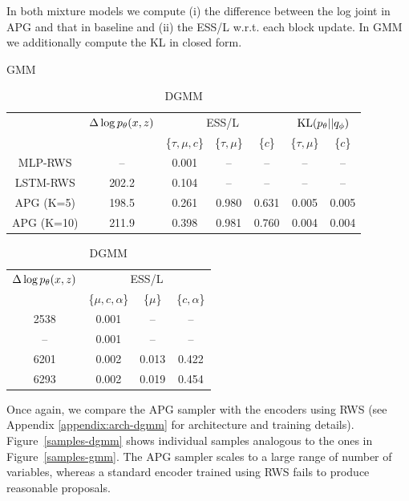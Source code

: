 \documentclass[anonymous=false, %
               format=acmsmall, %
               review=true, %
               screen=true, %
               nonacm=true]{acmart}
\theoremstyle{definition}
\begin{document}
\setlength{\tabcolsep}{2pt}
\begin{table}[t!]
    \centering
    \caption{In both mixture models we compute (i) the difference between the log joint in APG and that in baseline and (ii) the ESS/L w.r.t. each block update. In GMM we additionally compute the KL in closed form.}
    \vspace*{-3.5mm}
    \begin{subtable}{.4\linewidth}
    \centering
    \caption{GMM}
    \vspace{-0.7em}
    \begin{tabular}{ccc|cccc}
     
    \toprule
        & $\Delta \log p_\theta(x, z)$ & 
        \multicolumn{3}{c}{ESS/L} &
        \multicolumn{2}{c}{$\mathrm{KL}(p_\theta || q_\phi)$}\\
      & & \{$\tau, \mu, c$\} & \{$\tau, \mu$\} & \{$c$\} &\{$\tau, \mu$\}  & \{$c$\} \\
    \midrule
     MLP-RWS & -- & 0.001 & --& -- & -- & --\\
     LSTM-RWS & 202.2 & 0.104 & -- & -- & --
     & -- \\
     APG (K=5) & 198.5 & 0.261 & 0.980 &  0.631 & 0.005 & 0.005
\\
     APG (K=10) & 211.9 & 0.398 & 0.981  & 0.760
     & 0.004 & 0.004
     \\
    \bottomrule
    \end{tabular}   
    \label{table-gmm}
    \end{subtable}%
    \begin{subtable}{.85\linewidth}
    \centering
    \caption{DGMM}
    \vspace{-0.7em}
    \begin{tabular}{cc|cc}
    \toprule
     $\Delta \log p_\theta(x, z)$ & 
         \multicolumn{3}{c}{ESS/L} \\
         & \{$\mu, c, \alpha $\}& \{$\mu$\} & \{$c, \alpha$\}\\
    \midrule
    2538 & 0.001 & -- & -- \\
    -- & 0.001 & -- & --\\
    6201 & 0.002 & 0.013 & 0.422 \\
    6293 & 0.002 & 0.019 & 0.454 \\
    \bottomrule
    \end{tabular}
    \label{table-dgmm}
    \end{subtable}
    \label{table-both-mm}
\end{table}
Once again, we compare the APG sampler with the encoders using RWS (see Appendix \ref{appendix:arch-dgmm} for architecture and training details). Figure~\ref{samples-dgmm} shows individual samples analogous to the ones in Figure~\ref{samples-gmm}. The APG sampler scales to a large range of number of variables, whereas a standard encoder trained using RWS fails to produce reasonable proposals.
\end{document}
